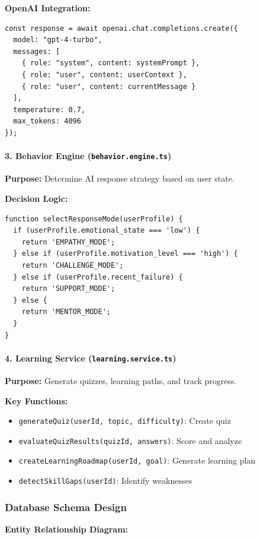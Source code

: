 \documentclass[12pt,a4paper]{article}
\begin{document}
\textbf{OpenAI Integration:}
\begin{verbatim}
const response = await openai.chat.completions.create({
  model: "gpt-4-turbo",
  messages: [
    { role: "system", content: systemPrompt },
    { role: "user", content: userContext },
    { role: "user", content: currentMessage }
  ],
  temperature: 0.7,
  max_tokens: 4096
});
\end{verbatim}

\paragraph{3. Behavior Engine (\texttt{behavior.engine.ts})}

\textbf{Purpose:} Determine AI response strategy based on user state.

\textbf{Decision Logic:}
\begin{verbatim}
function selectResponseMode(userProfile) {
  if (userProfile.emotional_state === 'low') {
    return 'EMPATHY_MODE';
  } else if (userProfile.motivation_level === 'high') {
    return 'CHALLENGE_MODE';
  } else if (userProfile.recent_failure) {
    return 'SUPPORT_MODE';
  } else {
    return 'MENTOR_MODE';
  }
}
\end{verbatim}

\paragraph{4. Learning Service (\texttt{learning.service.ts})}

\textbf{Purpose:} Generate quizzes, learning paths, and track progress.

\textbf{Key Functions:}
\begin{itemize}
    \item \texttt{generateQuiz(userId, topic, difficulty)}: Create quiz
    \item \texttt{evaluateQuizResults(quizId, answers)}: Score and analyze
    \item \texttt{createLearningRoadmap(userId, goal)}: Generate learning plan
    \item \texttt{detectSkillGaps(userId)}: Identify weaknesses
\end{itemize}

\subsubsection{Database Schema Design}

\textbf{Entity Relationship Diagram:}
\end{document}
